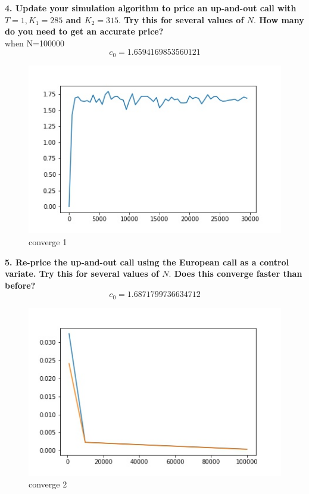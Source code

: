 \documentclass{winnower}
\begin{document}
\newpage
\textbf{4. Update your simulation algorithm to price an up-and-out call with $T=1, K_{1}=285$ and $K_{2}=315 .$ Try this for several values of $N .$ How many do you need to get an accurate price?}
\\

when N=100000
$$c_0=1.6594169853560121$$

\begin{figure}[!h]
\begin{center}
\includegraphics[scale=0.7]{1_2.jpg}
\caption
{converge 1}
\label{fig:f1}
\end{center}
\end{figure}





\textbf{5. Re-price the up-and-out call using the European call as a control variate. Try this for several values of $N .$ Does this converge faster than before?}
\\
$$c_0=1.6871799736634712$$


\begin{figure}[!h]
\begin{center}
\includegraphics[scale=0.7]{1_3.jpg}
\caption
{converge 2}
\label{fig:f1}
\end{center}
\end{figure}
\end{document}

